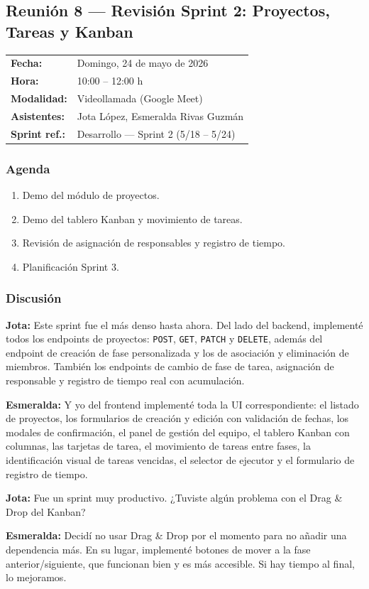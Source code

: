\documentclass[12pt, a4paper]{article}
\makeatletter
\newcommand{\actaheader}[5]{%
  \begin{mdframed}[
    backgroundcolor=sectionbg,
    linecolor=bordercolor,
    linewidth=1pt,
    innerleftmargin=12pt, innerrightmargin=12pt,
    innertopmargin=10pt, innerbottommargin=10pt,
    skipabove=8pt, skipbelow=8pt
  ]
  \begin{tabularx}{\linewidth}{@{}lX@{}}
    \textbf{Fecha:}       & #1 \\[2pt]
    \textbf{Hora:}        & #2 \\[2pt]
    \textbf{Modalidad:}   & #3 \\[2pt]
    \textbf{Asistentes:}  & #4 \\[2pt]
    \textbf{Sprint ref.:} & #5 \\
  \end{tabularx}
  \end{mdframed}%
}
\newcommand{\jota}[1]{\noindent\textbf{\color{primary}Jota:} #1\par\smallskip}
\newcommand{\esme}[1]{\noindent\textbf{\color{accentgreen}Esmeralda:} #1\par\smallskip}
\makeatother
\begin{document}
\subsection{Reunión 8 — Revisión Sprint 2: Proyectos, Tareas y Kanban}
\actaheader
  {Domingo, 24 de mayo de 2026}
  {10:00 -- 12:00 h}
  {Videollamada (Google Meet)}
  {Jota López, Esmeralda Rivas Guzmán}
  {Desarrollo — Sprint 2 (5/18 -- 5/24)}

\subsubsection*{Agenda}
\begin{enumerate}[leftmargin=1.5em]
  \item Demo del módulo de proyectos.
  \item Demo del tablero Kanban y movimiento de tareas.
  \item Revisión de asignación de responsables y registro de tiempo.
  \item Planificación Sprint 3.
\end{enumerate}

\subsubsection*{Discusión}

\jota{Este sprint fue el más denso hasta ahora. Del lado del backend, implementé todos los endpoints de proyectos: \texttt{POST}, \texttt{GET}, \texttt{PATCH} y \texttt{DELETE}, además del endpoint de creación de fase personalizada y los de asociación y eliminación de miembros. También los endpoints de cambio de fase de tarea, asignación de responsable y registro de tiempo real con acumulación.}

\esme{Y yo del frontend implementé toda la UI correspondiente: el listado de proyectos, los formularios de creación y edición con validación de fechas, los modales de confirmación, el panel de gestión del equipo, el tablero Kanban con columnas, las tarjetas de tarea, el movimiento de tareas entre fases, la identificación visual de tareas vencidas, el selector de ejecutor y el formulario de registro de tiempo.}

\jota{Fue un sprint muy productivo. ¿Tuviste algún problema con el Drag \& Drop del Kanban?}

\esme{Decidí no usar Drag \& Drop por el momento para no añadir una dependencia más. En su lugar, implementé botones de mover a la fase anterior/siguiente, que funcionan bien y es más accesible. Si hay tiempo al final, lo mejoramos.}
\end{document}
